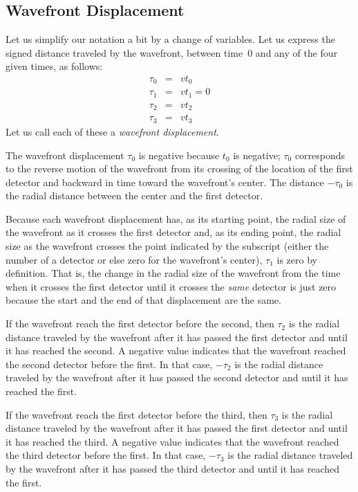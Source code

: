 \documentclass[twocolumn]{article}
\begin{document}
\subsection{Wavefront Displacement}

Let us simplify our notation a bit by a change of variables.  Let us express
the signed distance traveled by the wavefront, between time~0 and any of the
four given times, as follows:
\begin{eqnarray}
   \tau_0 &=& vt_0\\
   \tau_1 &=& vt_1 = 0\\
   \tau_2 &=& vt_2\\
   \tau_3 &=& vt_3
\end{eqnarray}
Let us call each of these a \emph{wavefront displacement}.

The wavefront displacement $\tau_0$ is negative because $t_0$ is negative;
$\tau_0$ corresponds to the reverse motion of the wavefront from its crossing
of the location of the first detector and backward in time toward the
wavefront's center.  The distance $-\tau_0$ is the radial distance between the
center and the first detector.

Because each wavefront displacement has, as its starting point, the radial size
of the wavefront as it crosses the first detector and, as its ending point, the
radial size as the wavefront crosses the point indicated by the subscript
(either the number of a detector or else zero for the wavefront's center),
$\tau_1$ is zero by definition.  That is, the change in the radial size of the
wavefront from the time when it crosses the first detector until it crosses the
\emph{same} detector is just zero because the start and the end of that
displacement are the same.

If the wavefront reach the first detector before the second, then $\tau_2$ is
the radial distance traveled by the wavefront after it has passed the first
detector and until it has reached the second.  A negative value indicates that
the wavefront reached the second detector before the first.  In that case,
$-\tau_2$ is the radial distance traveled by the wavefront after it has passed
the second detector and until it has reached the first.

If the wavefront reach the first detector before the third, then $\tau_3$ is
the radial distance traveled by the wavefront after it has passed the first
detector and until it has reached the third.  A negative value indicates that
the wavefront reached the third detector before the first.  In that case,
$-\tau_3$ is the radial distance traveled by the wavefront after it has passed
the third detector and until it has reached the first.
\end{document}
